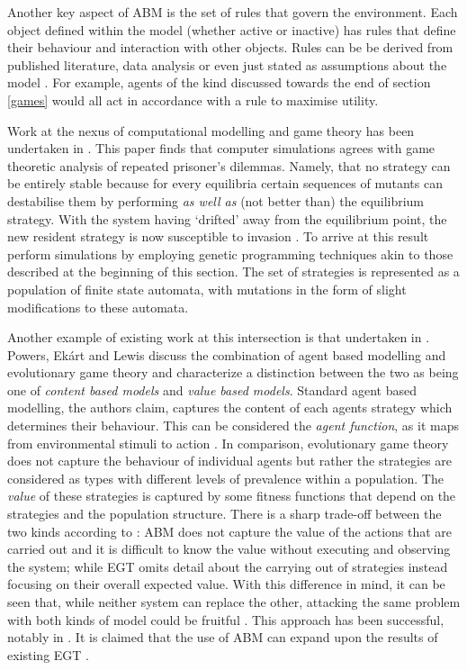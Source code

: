 \documentclass[11pt]{book}
\newcommand*{\np}{\par\noindent\newline}
\begin{document}
\np Another key aspect of ABM is the set of rules that govern the environment. Each object defined within the model
(whether active or inactive) has rules that define their behaviour and interaction with other objects. Rules can be be
derived from published literature, data analysis or even just stated as assumptions about the model
\citep{heppenstall_introduction_2012}. For example, agents of the kind discussed towards the end of section \ref{games}
would all act in accordance with a rule to maximise utility. 

\np Work at the nexus of computational modelling and game theory has been undertaken in \citet{garcia_no_2018}. This
paper finds that computer simulations agrees with game theoretic analysis of repeated prisoner's dilemmas. Namely, that
no strategy can be entirely stable because for every equilibria certain sequences of mutants can destabilise them by
performing \textit{as well as} (not better than) the equilibrium strategy. With the system having `drifted' away from
the equilibrium point, the new resident strategy is now susceptible to invasion \citep{garcia_no_2018}. To arrive at
this result \citet{garcia_no_2018} perform simulations by employing genetic programming techniques akin to those
described at the beginning of this section. The set of strategies is represented as a population of finite state
automata, with mutations in the form of slight modifications to these automata.

\np Another example of existing work at this intersection is that undertaken in \citet{powers_modelling_2018}. Powers,
Ekárt and Lewis discuss the combination of agent based modelling and evolutionary game theory and characterize a
distinction between the two as being one of \textit{content based models} and \textit{value based models}. Standard
agent based modelling, the authors claim, captures the content of each agents strategy which determines their behaviour.
This can be considered the \textit{agent function}, as it maps from environmental stimuli to action \citep[~p.
69]{powers_modelling_2018}. In comparison, evolutionary game theory does not capture the behaviour of individual agents
but rather the strategies are considered as types with different levels of prevalence within a population. The
\textit{value} of these strategies is captured by some fitness functions that depend on the strategies and the
population structure. There is a sharp trade-off between the two kinds according to \citet{powers_modelling_2018}: ABM
does not capture the value of the actions that are carried out and it is difficult to know the value without executing
and observing the system; while EGT omits detail about the carrying out of strategies instead focusing on their overall
expected value. With this difference in mind, it can be seen that, while neither system can replace the other, attacking
the same problem with both kinds of model could be fruitful \citep{powers_modelling_2018}. This approach has
been successful, notably in \citet{axelrod_effective_1980}. It is claimed that the use of ABM can expand upon the results of existing EGT \citep[~p.71]{powers_modelling_2018}.
\end{document}
